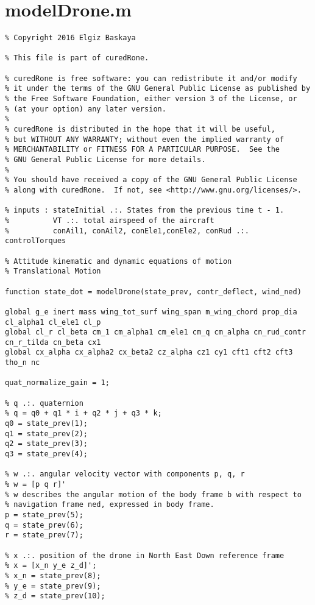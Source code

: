 \clearpage
\newpage

\section{modelDrone.m}
\begin{lstlisting}
% Copyright 2016 Elgiz Baskaya

% This file is part of curedRone.

% curedRone is free software: you can redistribute it and/or modify
% it under the terms of the GNU General Public License as published by
% the Free Software Foundation, either version 3 of the License, or
% (at your option) any later version.
% 
% curedRone is distributed in the hope that it will be useful,
% but WITHOUT ANY WARRANTY; without even the implied warranty of
% MERCHANTABILITY or FITNESS FOR A PARTICULAR PURPOSE.  See the
% GNU General Public License for more details.
% 
% You should have received a copy of the GNU General Public License
% along with curedRone.  If not, see <http://www.gnu.org/licenses/>.

% inputs : stateInitial .:. States from the previous time t - 1. 
%          VT .:. total airspeed of the aircraft
%          conAil1, conAil2, conEle1,conEle2, conRud .:. controlTorques 

% Attitude kinematic and dynamic equations of motion
% Translational Motion 

function state_dot = modelDrone(state_prev, contr_deflect, wind_ned)

global g_e inert mass wing_tot_surf wing_span m_wing_chord prop_dia cl_alpha1 cl_ele1 cl_p 
global cl_r cl_beta cm_1 cm_alpha1 cm_ele1 cm_q cm_alpha cn_rud_contr cn_r_tilda cn_beta cx1 
global cx_alpha cx_alpha2 cx_beta2 cz_alpha cz1 cy1 cft1 cft2 cft3 tho_n nc

quat_normalize_gain = 1;

% q .:. quaternion
% q = q0 + q1 * i + q2 * j + q3 * k;  
q0 = state_prev(1);
q1 = state_prev(2);
q2 = state_prev(3);
q3 = state_prev(4);

% w .:. angular velocity vector with components p, q, r
% w = [p q r]' 
% w describes the angular motion of the body frame b with respect to
% navigation frame ned, expressed in body frame.
p = state_prev(5);
q = state_prev(6);
r = state_prev(7);

% x .:. position of the drone in North East Down reference frame
% x = [x_n y_e z_d]';
% x_n = state_prev(8);
% y_e = state_prev(9);
% z_d = state_prev(10);


\end{lstlisting}
